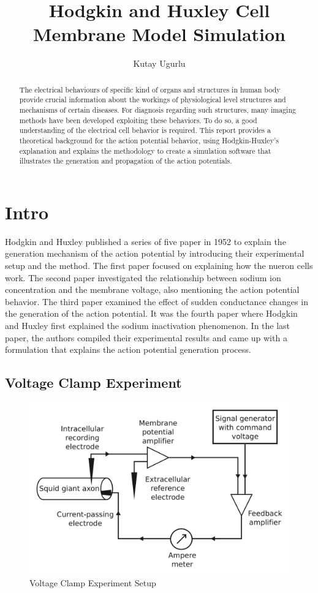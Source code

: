 \documentclass{IEEEtran}
\title{Hodgkin and Huxley Cell Membrane Model Simulation}
\author{Kutay Ugurlu}
\begin{document}
\maketitle
\begin{abstract}
    The electrical behaviours of specific kind of organs and structures in human body provide crucial information about the workings of physiological level structures and mechanisms of certain diseases. For diagnosis regarding such structures, many imaging methods have been developed exploiting these behaviors. To do so, a good understanding of the electrical cell behavior is required. This report provides a theoretical background for the action potential behavior, using Hodgkin-Huxley's explanation and explains the methodology to create a simulation software that illustrates the generation and propagation of the action potentials. 
\end{abstract}
\section{Intro}
Hodgkin and Huxley \cite{hodgkin1952quantitative} published a series of five paper in 1952 to explain the generation mechanism of the action potential by introducing their experimental setup and the method. The first paper focused on explaining how the nueron cells work. The second paper investigated the relationship between sodium ion concentration and the membrane voltage, also mentioning the action potential behavior. The third paper examined the effect of sudden conductance changes in the generation of the action potential. It was the fourth paper where Hodgkin and Huxley first explained the sodium inactivation phenomenon. In the last paper, the authors compiled their experimental results and came up with a formulation that explains the action potential generation process. 

\subsection{Voltage Clamp Experiment}

\begin{figure}[h]
\centering
\includegraphics[width=\textwidth]{VCE.png}
\caption{Voltage Clamp Experiment Setup}\label{fig:vce}
\end{figure}

\clearpage
\printbibliography{}
\end{document}
